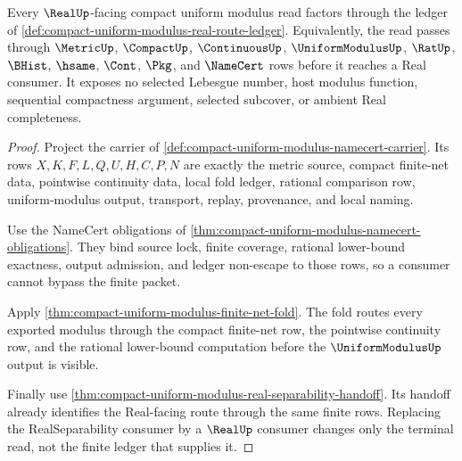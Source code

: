 \begin{theorem}
\label{thm:compact-uniform-modulus-real-route-exhaustion}
Every $\RealUp$-facing compact uniform modulus read factors through the ledger of \autoref{def:compact-uniform-modulus-real-route-ledger}. Equivalently, the read passes through $\MetricUp$, $\CompactUp$, $\ContinuousUp$, $\UniformModulusUp$, $\RatUp$, $\BHist$, $\hsame$, $\Cont$, $\Pkg$, and $\NameCert$ rows before it reaches a Real consumer. It exposes no selected Lebesgue number, host modulus function, sequential compactness argument, selected subcover, or ambient Real completeness.
\end{theorem}
\begin{proof}
Project the carrier of \autoref{def:compact-uniform-modulus-namecert-carrier}. Its rows $X,K,F,L,Q,U,H,C,P,N$ are exactly the metric source, compact finite-net data, pointwise continuity data, local fold ledger, rational comparison row, uniform-modulus output, transport, replay, provenance, and local naming.

Use the NameCert obligations of \autoref{thm:compact-uniform-modulus-namecert-obligations}. They bind source lock, finite coverage, rational lower-bound exactness, output admission, and ledger non-escape to those rows, so a consumer cannot bypass the finite packet.

Apply \autoref{thm:compact-uniform-modulus-finite-net-fold}. The fold routes every exported modulus through the compact finite-net row, the pointwise continuity row, and the rational lower-bound computation before the $\UniformModulusUp$ output is visible.

Finally use \autoref{thm:compact-uniform-modulus-real-separability-handoff}. Its handoff already identifies the Real-facing route through the same finite rows. Replacing the RealSeparability consumer by a $\RealUp$ consumer changes only the terminal read, not the finite ledger that supplies it.
\end{proof}

